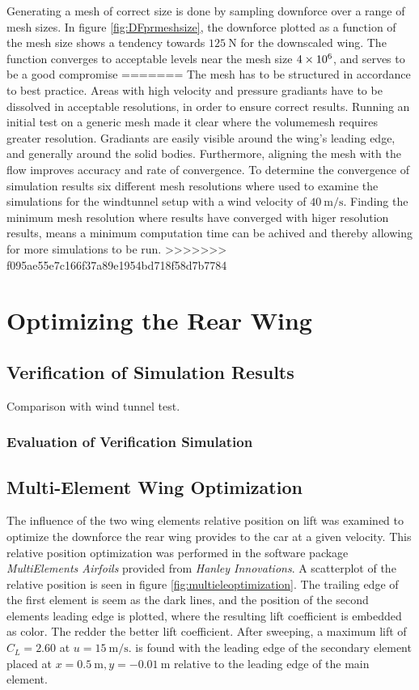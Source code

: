   Generating a mesh of correct size is done by sampling downforce over a range of mesh sizes. In figure \ref{fig:DFprmeshsize}, the downforce plotted as a function of the mesh size shows a tendency towards $\SI{125}{\newton}$ for the downscaled wing. The function converges to acceptable levels near the mesh size $\SI{4E6}{}$, and serves to be a good compromise
=======
The mesh has to be structured in accordance to best practice. Areas with high velocity and pressure gradiants have to be dissolved in acceptable resolutions, in order to ensure correct results. Running an initial test on a generic mesh made it clear where the volumemesh requires greater resolution. Gradiants are easily visible around the wing's leading edge, and generally around the solid bodies. Furthermore, aligning the mesh with the flow improves accuracy and rate of convergence. To determine the convergence of simulation results six different mesh resolutions where used to examine the simulations for the windtunnel setup with a wind velocity of $\SI{40}{\metre\per\second}$. Finding the minimum mesh resolution where results have converged with higer resolution results, means a minimum computation time can be achived and thereby allowing for more simulations to be run.
>>>>>>> f095ae55e7c166f37a89e1954bd718f58d7b7784

\section{Optimizing the Rear Wing}


  \subsection{Verification of Simulation Results}
  \label{sec:simulationcomparison}

  Comparison with wind tunnel test.

  \subsubsection{Evaluation of Verification Simulation}

  \subsection{Multi-Element Wing Optimization}
  The influence of the two wing elements relative position on lift was examined to optimize the downforce the rear wing provides to the car at a given velocity. This relative position optimization was performed in the software package \emph{MultiElements Airfoils} provided from \emph{Hanley Innovations}. A scatterplot of the relative position is seen in figure \ref{fig:multieleoptimization}. The trailing edge of the first element is seem as the dark lines, and the position of the second elements leading edge is plotted, where the resulting lift coefficient is embedded as color. The redder the better lift coefficient. After sweeping, a maximum lift of $C_L = 2.60$  at $u = \SI{15}{\metre\per\second}$. is found with the leading edge of the secondary element placed at $x=\SI{0.5}{\metre},y=\SI{-0.01}{\metre}$ relative to the leading edge of the main element.

